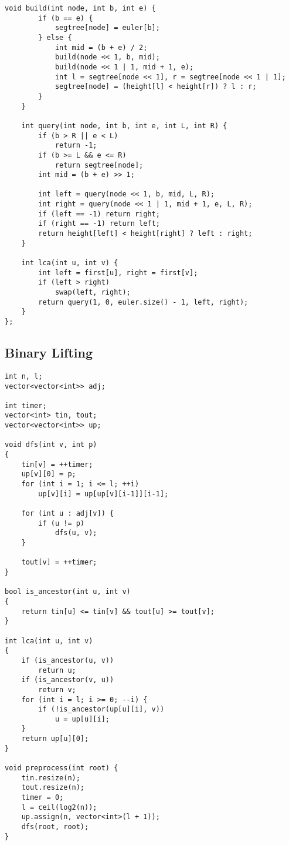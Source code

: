 \documentclass[10pt]{article}
\begin{document}
\begin{multicols*}{2}
\begin{lstlisting}[style=compactcpp]
    void build(int node, int b, int e) {
        if (b == e) {
            segtree[node] = euler[b];
        } else {
            int mid = (b + e) / 2;
            build(node << 1, b, mid);
            build(node << 1 | 1, mid + 1, e);
            int l = segtree[node << 1], r = segtree[node << 1 | 1];
            segtree[node] = (height[l] < height[r]) ? l : r;
        }
    }

    int query(int node, int b, int e, int L, int R) {
        if (b > R || e < L)
            return -1;
        if (b >= L && e <= R)
            return segtree[node];
        int mid = (b + e) >> 1;

        int left = query(node << 1, b, mid, L, R);
        int right = query(node << 1 | 1, mid + 1, e, L, R);
        if (left == -1) return right;
        if (right == -1) return left;
        return height[left] < height[right] ? left : right;
    }

    int lca(int u, int v) {
        int left = first[u], right = first[v];
        if (left > right)
            swap(left, right);
        return query(1, 0, euler.size() - 1, left, right);
    }
};
\end{lstlisting}

\subsection{Binary Lifting}

\begin{lstlisting}[style=compactcpp]
int n, l;
vector<vector<int>> adj;

int timer;
vector<int> tin, tout;
vector<vector<int>> up;

void dfs(int v, int p)
{
    tin[v] = ++timer;
    up[v][0] = p;
    for (int i = 1; i <= l; ++i)
        up[v][i] = up[up[v][i-1]][i-1];

    for (int u : adj[v]) {
        if (u != p)
            dfs(u, v);
    }

    tout[v] = ++timer;
}

bool is_ancestor(int u, int v)
{
    return tin[u] <= tin[v] && tout[u] >= tout[v];
}

int lca(int u, int v)
{
    if (is_ancestor(u, v))
        return u;
    if (is_ancestor(v, u))
        return v;
    for (int i = l; i >= 0; --i) {
        if (!is_ancestor(up[u][i], v))
            u = up[u][i];
    }
    return up[u][0];
}

void preprocess(int root) {
    tin.resize(n);
    tout.resize(n);
    timer = 0;
    l = ceil(log2(n));
    up.assign(n, vector<int>(l + 1));
    dfs(root, root);
}
\end{lstlisting}


\end{multicols*}
\end{document}

